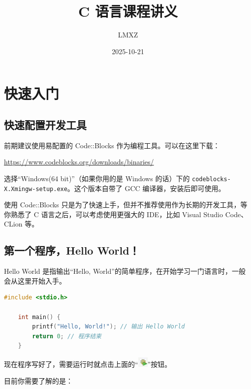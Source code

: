 \documentclass[lang=cn,newtx,10pt,scheme=chinese]{elegantbook}
\title{C 语言课程讲义}
\author{LMXZ}
\date{2025-10-21}
\begin{document}
\maketitle
\frontmatter

\tableofcontents

\mainmatter

\chapter{快速入门}

\section{快速配置开发工具}

前期建议使用易配置的 Code::Blocks 作为编程工具。可以在这里下载：

\href{https://www.codeblocks.org/downloads/binaries/}
{https://www.codeblocks.org/downloads/binaries/}

选择“Windows(64 bit)”（如果你用的是 Windows 的话）下的 \lstinline{codeblocks-X.Xmingw-setup.exe}。这个版本自带了 GCC 编译器，安装后即可使用。

使用 Code::Blocks 只是为了快速上手，但并不推荐使用作为长期的开发工具，等你熟悉了 C 语言之后，可以考虑使用更强大的 IDE，比如 Visual Studio Code、CLion 等。

\section{第一个程序，Hello World！}

Hello World 是指输出“Hello, World”的简单程序，在开始学习一门语言时，一般会从这里开始入手。

\begin{lstlisting}[language=C]
    #include <stdio.h>
    
    int main() {
        printf("Hello, World!"); // 输出 Hello World
        return 0; // 程序结束
    }
\end{lstlisting}        

现在程序写好了，需要运行时就点击上面的“\includegraphics{image/btn_compile_run.png}”按钮。

目前你需要了解的是：
\end{document}
